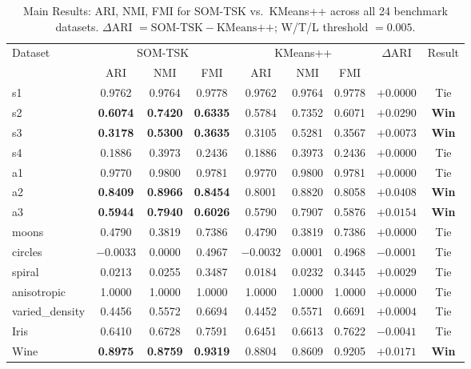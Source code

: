 \documentclass[journal]{IEEEtran}
\begin{document}
\begin{table}[!t]
\caption{Main Results: ARI, NMI, FMI for SOM-TSK vs.\ KMeans++ across all 24 benchmark datasets. $\Delta$ARI $= \text{SOM-TSK} - \text{KMeans++}$; W/T/L threshold $= 0.005$.}
\label{tab:main_results}
\centering
\renewcommand{\arraystretch}{1.05}
\setlength{\tabcolsep}{4pt}
\begin{tabular}{lcccccccc}
\toprule
\multirow{2}{*}{Dataset} & \multicolumn{3}{c}{SOM-TSK} & \multicolumn{3}{c}{KMeans++} & \multirow{2}{*}{$\Delta$ARI} & \multirow{2}{*}{Result} \\
\cmidrule(lr){2-4}\cmidrule(lr){5-7}
 & ARI & NMI & FMI & ARI & NMI & FMI & & \\
\midrule
s1 & 0.9762 & 0.9764 & 0.9778 & 0.9762 & 0.9764 & 0.9778 & $+0.0000$ & Tie \\
s2 & \textbf{0.6074} & \textbf{0.7420} & \textbf{0.6335} & 0.5784 & 0.7352 & 0.6071 & $\mathbf{+0.0290}$ & \textbf{Win} \\
s3 & \textbf{0.3178} & \textbf{0.5300} & \textbf{0.3635} & 0.3105 & 0.5281 & 0.3567 & $\mathbf{+0.0073}$ & \textbf{Win} \\
s4 & 0.1886 & 0.3973 & 0.2436 & 0.1886 & 0.3973 & 0.2436 & $+0.0000$ & Tie \\
a1 & 0.9770 & 0.9800 & 0.9781 & 0.9770 & 0.9800 & 0.9781 & $+0.0000$ & Tie \\
a2 & \textbf{0.8409} & \textbf{0.8966} & \textbf{0.8454} & 0.8001 & 0.8820 & 0.8058 & $\mathbf{+0.0408}$ & \textbf{Win} \\
a3 & \textbf{0.5944} & \textbf{0.7940} & \textbf{0.6026} & 0.5790 & 0.7907 & 0.5876 & $\mathbf{+0.0154}$ & \textbf{Win} \\
moons & 0.4790 & 0.3819 & 0.7386 & 0.4790 & 0.3819 & 0.7386 & $+0.0000$ & Tie \\
circles & $-0.0033$ & 0.0000 & 0.4967 & $-0.0032$ & 0.0001 & 0.4968 & $-0.0001$ & Tie \\
spiral & 0.0213 & 0.0255 & 0.3487 & 0.0184 & 0.0232 & 0.3445 & $+0.0029$ & Tie \\
anisotropic & 1.0000 & 1.0000 & 1.0000 & 1.0000 & 1.0000 & 1.0000 & $+0.0000$ & Tie \\
varied\_density & 0.4456 & 0.5572 & 0.6694 & 0.4452 & 0.5571 & 0.6691 & $+0.0004$ & Tie \\
Iris & 0.6410 & 0.6728 & 0.7591 & 0.6451 & 0.6613 & 0.7622 & $-0.0041$ & Tie \\
Wine & \textbf{0.8975} & \textbf{0.8759} & \textbf{0.9319} & 0.8804 & 0.8609 & 0.9205 & $\mathbf{+0.0171}$ & \textbf{Win} \\

\end{tabular}
\end{table}
\end{document}

